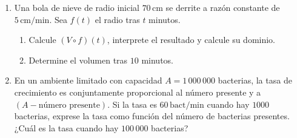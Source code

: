 \begin{prob}
\begin{enumerate}
\begin{figure}[!htbp]
\begin{center}
\end{center}
\caption{Patrón para la tienda de acampar (pirámide de base cuadrada): cuadrado de $5\,\mathrm{m}$ de lado; $x$ es la distancia del centro al lado de la base.}
\label{fig:caja-3d}
\end{figure}

\textit{Sugerencia:} La fórmula para el volumen de una pirámide es $V=\dfrac{1}{3}Bh,$ donde $V,\ B$ y $h$ son, respectivamente, la medida del volumen, el área de la base y la altura. Esta altura se define como la medida del segmento perpendicular del vértice de la pirámide al plano de la base.  

 \item Una bola de nieve de radio inicial $70\,\mathrm{cm}$ se derrite a razón constante de $5\,\mathrm{cm/min}$. Sea $f(t)$ el radio tras $t$ minutos.
    \begin{enumerate}
      \item Calcule $(V \circ f)(t)$, interprete el resultado y calcule su dominio.
      \item Determine el volumen tras $10$ minutos.
    \end{enumerate}

 \item En un ambiente limitado con capacidad $A = 1\,000\,000$ bacterias, la tasa de crecimiento es conjuntamente proporcional al número presente y a $(A - \text{número presente})$. Si la tasa es $60\,\mathrm{bact/min}$ cuando hay $1000$ bacterias, exprese la tasa como función del número de bacterias presentes. ¿Cuál es la tasa cuando hay $100\,000$ bacterias?


\end{enumerate}
\end{prob}
